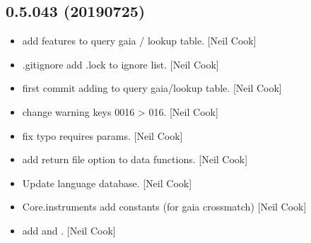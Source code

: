 \documentclass[a4paper,10pt,english]{report}
\begin{document}
\subsection{0.5.043 (2019\sphinxhyphen{}07\sphinxhyphen{}25)}
\label{\detokenize{misc/changelog:id117}}\begin{itemize}
\item {} 
 \sphinxhyphen{} add features to query gaia / lookup table.
{[}Neil Cook{]}

\item {} 
.gitignore \sphinxhyphen{} add .lock to ignore list. {[}Neil Cook{]}

\item {} 
 \sphinxhyphen{} first commit \textendash{} adding to query
gaia/lookup table. {[}Neil Cook{]}

\item {} 
 \sphinxhyphen{} change warning keys 0016 \textendash{}\textgreater{} 016.
{[}Neil Cook{]}

\item {} 
 \sphinxhyphen{} fix typo  requires params. {[}Neil
Cook{]}

\item {} 
 \sphinxhyphen{} add return file option to data functions. {[}Neil Cook{]}

\item {} 
Update language database. {[}Neil Cook{]}

\item {} 
Core.instruments \sphinxhyphen{} add  constants (for gaia crossmatch) {[}Neil
Cook{]}

\item {} 
 \sphinxhyphen{} add  and . {[}Neil Cook{]}

\end{itemize}
\end{document}
